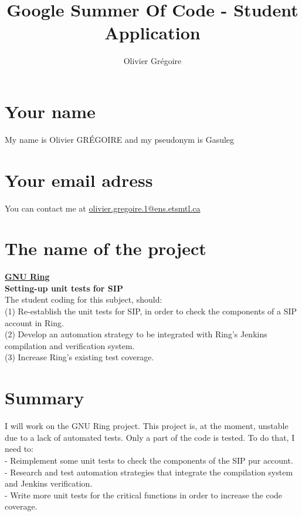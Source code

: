 \documentclass{article}
\title{Google Summer Of Code - Student Application}
\author{Olivier Grégoire}
\begin{document}
\maketitle

\section{Your name}
My name is Olivier GRÉGOIRE and my pseudonym is Gasuleg

\section{Your email adress}
You can contact me at
\href{mailto:olivier.gregoire.1@ens.etsmtl.ca}{olivier.gregoire.1@ens.etsmtl.ca}


\section{The name of the project}

\underline{\textbf{GNU Ring}} \\
\textbf{Setting-up unit tests for SIP} \\
The student coding for this subject, should: \\
(1) Re-establish the unit tests for SIP, in order to check the components of a SIP account in Ring.\\
(2) Develop an automation strategy to be integrated with Ring's Jenkins compilation and verification system. \\
(3) Increase Ring's existing test coverage. \\

\section{Summary}
I will work on the GNU Ring project. This project is, at the moment, unstable due to a lack of automated tests. Only a part of the code is tested. To do that, I need to: \\
  - Reimplement some unit tests to check the components of the SIP pur account. \\
  - Research and test automation strategies that integrate the compilation system and Jenkins verification. \\
  - Write more unit tests for the critical functions in order to increase the code coverage.\\
\end{document}
